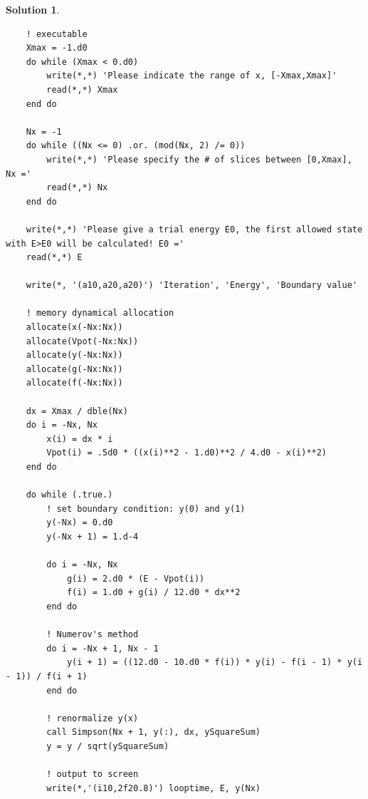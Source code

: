 \documentclass[UTF8,10pt,a4paper]{article}
\theoremstyle{Problem}
\theoremstyle{Solution}
\newtheorem*{sol}{Solution}
\begin{document}
\begin{sol}
\begin{lstlisting}
    ! executable
    Xmax = -1.d0
    do while (Xmax < 0.d0)
        write(*,*) 'Please indicate the range of x, [-Xmax,Xmax]'
        read(*,*) Xmax
    end do

    Nx = -1
    do while ((Nx <= 0) .or. (mod(Nx, 2) /= 0))
        write(*,*) 'Please specify the # of slices between [0,Xmax], Nx ='
        read(*,*) Nx
    end do

    write(*,*) 'Please give a trial energy E0, the first allowed state with E>E0 will be calculated! E0 ='
    read(*,*) E

    write(*, '(a10,a20,a20)') 'Iteration', 'Energy', 'Boundary value'

    ! memory dynamical allocation
    allocate(x(-Nx:Nx))
    allocate(Vpot(-Nx:Nx))
    allocate(y(-Nx:Nx))
    allocate(g(-Nx:Nx))
    allocate(f(-Nx:Nx))

    dx = Xmax / dble(Nx)
    do i = -Nx, Nx
        x(i) = dx * i
        Vpot(i) = .5d0 * ((x(i)**2 - 1.d0)**2 / 4.d0 - x(i)**2)
    end do

    do while (.true.)
        ! set boundary condition: y(0) and y(1)
        y(-Nx) = 0.d0
        y(-Nx + 1) = 1.d-4

        do i = -Nx, Nx
            g(i) = 2.d0 * (E - Vpot(i))
            f(i) = 1.d0 + g(i) / 12.d0 * dx**2
        end do

        ! Numerov's method
        do i = -Nx + 1, Nx - 1
            y(i + 1) = ((12.d0 - 10.d0 * f(i)) * y(i) - f(i - 1) * y(i - 1)) / f(i + 1)
        end do

        ! renormalize y(x)
        call Simpson(Nx + 1, y(:), dx, ySquareSum)
        y = y / sqrt(ySquareSum)

        ! output to screen
        write(*,'(i10,2f20.8)') looptime, E, y(Nx)


\end{lstlisting}
\end{sol}
\end{document}

